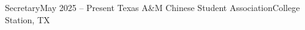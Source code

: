 \resumeSubheading
  {Secretary}{May 2025 -- Present}
  {Texas A\&M Chinese Student Association}{College Station, TX}
  \resumeItemListStart
    \CSALeadershipBulletstrue
    
    \CSALeadershipBulletsfalse
  \resumeItemListEnd

